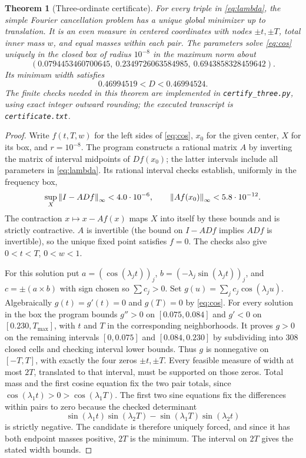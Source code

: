 \documentclass[11pt]{article}
\newtheorem{theorem}{Theorem}[section]
\theoremstyle{remark}\newtheorem{remark}[theorem]{Remark}
\begin{document}
\begin{theorem}[Three-ordinate certificate]\label{thm:actual}
For every triple in \eqref{eq:lambda}, the simple Fourier cancellation problem has a unique global minimizer up to translation. It is an even measure in centered coordinates with nodes $\pm t,\pm T$, total inner mass $w$, and equal masses within each pair. The parameters solve \eqref{eq:cos} uniquely in the closed box of radius $10^{-8}$ in the maximum norm about
\[
 (0.0794453460700645,\ 0.2349726063584985,\ 0.6943858328459642).
\]
Its minimum width satisfies
\[
 \boxed{0.46994519<D<0.46994524.}
\]
The finite checks needed in this theorem are implemented in \texttt{certify\_three.py}, using exact integer outward rounding; the executed transcript is \texttt{certificate.txt}.
\end{theorem}
\begin{proof}
Write $f(t,T,w)$ for the left sides of \eqref{eq:cos}, $x_0$ for the given center, $X$ for its box, and $r=10^{-8}$. The program constructs a rational matrix $A$ by inverting the matrix of interval midpoints of $Df(x_0)$; the latter intervals include all parameters in \eqref{eq:lambda}. Its rational interval checks establish, uniformly in the frequency box,
\[
 \sup_X\left\|I-A Df\right\|_\infty<4.0\cdot10^{-6},\qquad
 \left\|A f(x_0)\right\|_\infty<5.8\cdot10^{-12}.
\]
The contraction $x\mapsto x-Af(x)$ maps $X$ into itself by these bounds and is strictly contractive. $A$ is invertible (the bound on $I-A Df$ implies $A Df$ is invertible), so the unique fixed point satisfies $f=0$. The checks also give $0<t<T$, $0<w<1$.

For this solution put $a=(\cos(\lambda_jt))_j$, $b=(-\lambda_j\sin(\lambda_jt))_j$, and $c=\pm(a\times b)$ with sign chosen so $\sum c_j>0$. Set $g(u)=\sum_j c_j\cos(\lambda_ju)$. Algebraically $g(t)=g'(t)=0$ and $g(T)=0$ by \eqref{eq:cos}. For every solution in the box the program bounds $g''>0$ on $[0.075,0.084]$ and $g'<0$ on $[0.230,T_{\max}]$, with $t$ and $T$ in the corresponding neighborhoods. It proves $g>0$ on the remaining intervals $[0,0.075]$ and $[0.084,0.230]$ by subdividing into 308 closed cells and checking interval lower bounds. Thus $g$ is nonnegative on $[-T,T]$, with exactly the four zeros $\pm t,\pm T$. Every feasible measure of width at most $2T$, translated to that interval, must be supported on those zeros. Total mass and the first cosine equation fix the two pair totals, since $\cos(\lambda_1t)>0>\cos(\lambda_1T)$. The first two sine equations fix the differences within pairs to zero because the checked determinant
\[
 \sin(\lambda_1t)\sin(\lambda_2T)-\sin(\lambda_1T)\sin(\lambda_2t)
\]
is strictly negative. The candidate is therefore uniquely forced, and since it has both endpoint masses positive, $2T$ is the minimum. The interval on $2T$ gives the stated width bounds.


\end{proof}
\end{document}
